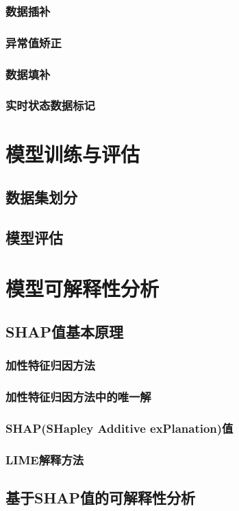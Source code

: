 \documentclass[12pt, a4paper, oneside]{ctexart}
\numberwithin{equation}{section}  %
\begin{document}
\subsubsection{数据插补}
\subsubsection{异常值矫正}
\subsubsection{数据填补}
\subsubsection{实时状态数据标记}

\clearpage
\section{模型训练与评估}
\subsection{数据集划分}
\subsection{模型评估}
\section{模型可解释性分析}
\subsection{SHAP值基本原理}
\subsubsection{加性特征归因方法}
\subsubsection{加性特征归因方法中的唯一解}
\subsubsection{SHAP(SHapley Additive exPlanation)值}
\subsubsection{LIME解释方法}
\subsection{基于SHAP值的可解释性分析}
\end{document}
